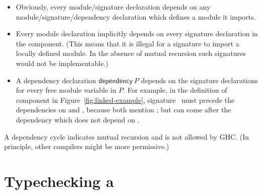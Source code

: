 \begin{itemize}
    \item Obviously, every module/signature declaration depends on
    any module/signature/dependency declaration which defines a
    module it imports.
    \item Every module declaration implicitly depends on every signature
    declaration in the component.  (This means that it is illegal for a
    signature to import a locally defined module.  In the absence of
    mutual recursion such signatures would not be implementable.)
    \item A dependency declaration $\textsf{dependency}~P$ depends
    on the signature declarations for every free module variable
    in $P$.  For example, in the definition of component  in
    Figure~\ref{fig:linked-example},
    \textsf{signature}~ must precede the dependencies
    on  and , because both mention ; but
    can come after the  dependency which does not
    depend on .

\end{itemize}
%
A dependency cycle indicates mutual recursion and is not allowed by GHC\@.
(In principle, other compilers might be more permissive.)

\section{Typechecking a \unit{}}
\label{sec:overview-compiler}


